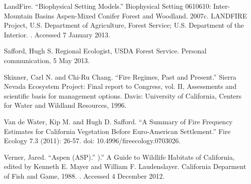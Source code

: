 \begin{hangparas}{.25in}{1}
LandFire. ``Biophysical Setting Models.'' Biophysical Setting 0610610: Inter-Mountain Basins Aspen-Mixed Conifer Forest and Woodland. 2007c. LANDFIRE Project, U.S. Department of Agriculture, Forest Service; U.S. Department of the Interior. . Accessed 7 January 2013.

Safford, Hugh S. Regional Ecologist, USDA Forest Service. Personal communication, 5 May 2013.

Skinner, Carl N. and Chi-Ru Chang. ``Fire Regimes, Past and Present.'' Sierra Nevada Ecosystem Project: Final report to Congress, vol. II, Assessments and scientific basis for management options. Davis: University of California, Centers for Water and Wildland Resources, 1996.

Van de Water, Kip M. and Hugh D. Safford. ``A Summary of Fire Frequency Estimates for California Vegetation Before Euro-American Settlement.'' Fire Ecology 7.3 (2011): 26-57. doi: 10.4996/fireecology.0703026.

Verner, Jared. ``Aspen (ASP).'' ).'' A Guide to Wildlife Habitats of California, edited by Kenneth E. Mayer and William F. Laudenslayer. California Deparment of Fish and Game, 1988. . Accessed 4 December 2012.

\end{hangparas}

